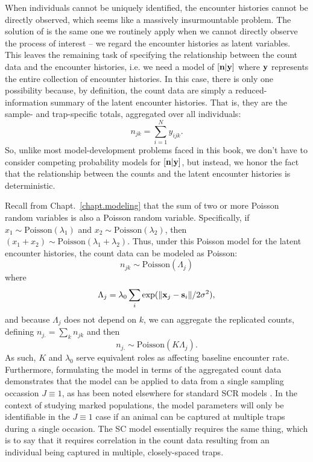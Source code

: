When individuals cannot be uniquely identified, the encounter histories cannot
be directly observed, which seems like a massively insurmountable
problem. The solution of \citet{chandler_royle:2012} is the same one we routinely apply when we
cannot directly observe the process of interest -- we regard the
encounter histories as latent variables. This leaves the remaining
task of specifying the relationship between the count data and
the encounter histories, i.e. we need a model of $[{\bf n}|{\bf y}]$
where $\bf y$ represents the entire collection of encounter
histories. In this case, there is only one possibility because, by
definition, the count data are simply a
reduced-information summary of the latent encounter histories. That
is, they are the sample- and trap-specific totals, aggregated over all
individuals:
\begin{equation}
n_{jk} = \sum_{i=1}^{N} y_{ijk}.
\label{unmarked.eq.ny}
\end{equation}
So, unlike most model-development problems faced in this book, we
don't have to consider competing probability models for
$[{\bf n}|{\bf y}]$, but instead, we honor the fact that the
relationship between the counts and the latent encounter histories is
deterministic. %


Recall from Chapt.~\ref{chapt.modeling} that the sum of two or more
Poisson random variables is also a Poisson random variable.
Specifically,
if $x_1 \sim \text{Poisson}(\lambda_1)$ and
$x_2 \sim \text{Poisson}(\lambda_2)$, then $(x_1+x_2) \sim
\text{Poisson}(\lambda_1 + \lambda_2)$. Thus,
under this Poisson model for the latent encounter histories,
the count data can be modeled as Poisson:
\begin{equation}
n_{jk} \sim \mbox{Poisson}( \Lambda_{j} )
\label{eq:nagg}
\end{equation}
where
\[
 \Lambda_{j} = \lambda_0 \sum_{i} \exp(\| {\bf x}_j - {\bf s}_i \| / 2\sigma^2),
\]
and because $\Lambda_j$ does not depend on $k$, we can
aggregate the replicated counts, defining
$n_{j.} = \sum_{k} n_{jk}$ and then
\[
 n_{j.} \sim \mbox{Poisson}( K \Lambda_{j} ).
\]
As such, $K$ and $\lambda_{0}$ serve equivalent roles as affecting
baseline encounter rate.
Furthermore, formulating the model in terms of the aggregated count data
demonstrates that the model can be
applied to data from a single sampling occassion $J \equiv 1$, as has
been noted elsewhere for standard SCR models
\citep{efford_etal:2009ecol}. In the context of studying marked
populations, the model parameters will only be identifiable in the
$J\equiv 1$ case if an animal can be captured at multiple traps during
a single occasion. The SC model essentially requires the same thing,
which is to say that it requires correlation in the count data
resulting from an individual being captured in multiple,
closely-spaced traps.

